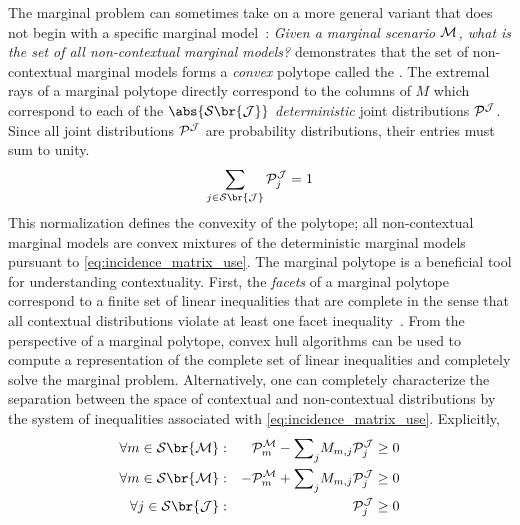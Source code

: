 \documentclass[aps, 10pt, english, twoside, pra, nofootinbib, tightenlines, longbibliography, superscriptaddress]{revtex4-1}
\renewcommand{\Events}[1]{\mathcal{S}\br{#1}} %
\begin{document}
    The marginal problem can sometimes take on a more general variant that does not begin with a specific marginal model~\cite{Abramsky_2012,Mansfield_2012,Fritz_2011}: \textit{Given a marginal scenario $\mathcal{M}$, what is the set of all non-contextual marginal models?} \citet{Pitowsky_1991} demonstrates that the set of non-contextual marginal models forms a \textit{convex} polytope called the . The extremal rays of a marginal polytope directly correspond to the columns of $M$ which correspond to each of the $\abs{\Events{\jointvar}}$ \textit{deterministic} joint distributions $\probvec^{\jointvar}$. Since all joint distributions $\probvec^{\jointvar}$ are probability distributions, their entries must sum to unity.
    \[ \sum_{j \in \Events{\jointvar}} \probvec^{\jointvar}_j = 1 \]
    This normalization defines the convexity of the polytope; all non-contextual marginal models are convex mixtures of the deterministic marginal models pursuant to \cref{eq:incidence_matrix_use}. The marginal polytope is a beneficial tool for understanding contextuality. First, the \textit{facets} of a marginal polytope correspond to a finite set of linear inequalities that are complete in the sense that all contextual distributions violate at least one facet inequality~\cite{Brunner_2013}. From the perspective of a marginal polytope, convex hull algorithms can be used to compute a representation of the complete set of linear inequalities and completely solve the marginal problem. Alternatively, one can completely characterize the separation between the space of contextual and non-contextual distributions by the system of inequalities associated with \cref{eq:incidence_matrix_use}. Explicitly,
    \begin{equation} \label{eq:halfspace_rep_incidence}
    \begin{alignedat}{2}
        \forall m \in \Events{\mscenario} :&&\quad \probvec^{\mscenario}_m - {\sum}_{j} M_{m, j} \probvec^{\jointvar}_j &\geq 0 \\
        \forall m \in \Events{\mscenario} :&&\quad -\probvec^{\mscenario}_m + {\sum}_{j} M_{m, j} \probvec^{\jointvar}_j &\geq 0 \\
        \forall j \in \Events{\jointvar} :&&\quad \probvec^{\jointvar}_j &\geq 0
    \end{alignedat}
    \end{equation}
\end{document}
